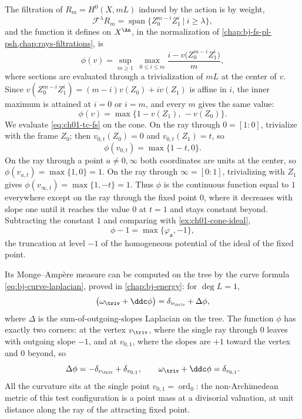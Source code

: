 \begin{example}
\label{ex:ch01-product-tc}
The filtration of $R_m=H^0(X,mL)$ induced by the action is by weight,
\[
   \mathcal F^\lambda R_m
   =\operatorname{span}\bigl\{Z_0^{m-i}Z_1^i\ \big|\ i\geq\lambda\bigr\},
\]
and the function it defines on $X^{\An}$, in the normalization of
\cref{chap:bj-fs-pl-psh,chap:rays-filtrations}, is
\[
 \phi(v)=\sup_{m\geq1}\ \max_{0\leq i\leq m}
   \frac{i-v\bigl(Z_0^{m-i}Z_1^i\bigr)}{m},
\]
where sections are evaluated through a trivialization of $mL$ at the center
of $v$.  Since $v(Z_0^{m-i}Z_1^i)=(m-i)v(Z_0)+iv(Z_1)$ is affine in $i$,
the inner maximum is attained at $i=0$ or $i=m$, and every $m$ gives the
same value:
\begin{equation}\label{eq:ch01-tc-fs}
 \phi(v)=\max\bigl\{1-v(Z_1),\,-v(Z_0)\bigr\}.
\end{equation}
We evaluate \eqref{eq:ch01-tc-fs} on the cone.  On the ray through
$0=[1:0]$, trivialize with the frame $Z_0$; then $v_{0,t}(Z_0)=0$ and
$v_{0,t}(Z_1)=t$, so
\[
 \phi(v_{0,t})=\max\{1-t,0\}.
\]
On the ray through a point $a\neq0,\infty$ both coordinates are units at
the center, so $\phi(v_{a,t})=\max\{1,0\}=1$.  On the ray through
$\infty=[0:1]$, trivializing with $Z_1$ gives
$\phi(v_{\infty,t})=\max\{1,-t\}=1$.  Thus $\phi$ is the continuous
function equal to $1$ everywhere except on the ray through the fixed point
$0$, where it decreases with slope one until it reaches the value $0$ at
$t=1$ and stays constant beyond.  Subtracting the constant $1$ and
comparing with \cref{ex:ch01-cone-ideal},
\[
 \phi-1=\max\{\varphi_{\mathfrak a},-1\},
\]
the truncation at level $-1$ of the homogeneous potential of the ideal of
the fixed point.

Its Monge--Amp\`ere measure can be computed on the tree by the curve
formula \eqref{eq:bj-curve-laplacian}, proved in \cref{chap:bj-energy}: for
$\deg L=1$,
\[
 \bigl(\omega_{\triv}+\ddc\phi\bigr)
 =\delta_{v_{\triv}}+\Delta\phi ,
\]
where $\Delta$ is the sum-of-outgoing-slopes Laplacian on the tree.  The
function $\phi$ has exactly two corners: at the vertex $v_{\triv}$, where
the single ray through $0$ leaves with outgoing slope $-1$, and at
$v_{0,1}$, where the slopes are $+1$ toward the vertex and $0$ beyond, so
\[
 \Delta\phi=-\delta_{v_{\triv}}+\delta_{v_{0,1}},
 \qquad
 \omega_{\triv}+\ddc\phi=\delta_{v_{0,1}} .
\]
All the curvature sits at the single point $v_{0,1}=\operatorname{ord}_0$:
the non-Archimedean metric of this test configuration is a point mass at a
divisorial valuation, at unit distance along the ray of the attracting
fixed point.
\end{example}

